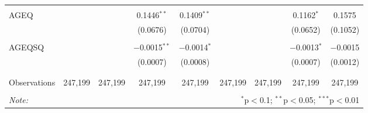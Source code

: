 \documentclass{article}
\begin{document}
\begin{sidewaystable}[!htbp]
\begin{tabular}{@{\extracolsep{5pt}}lcccccccc}
  & & & & & & & & \\ 
 AGEQ &  &  & 0.1446$^{**}$ & 0.1409$^{**}$ &  &  & 0.1162$^{*}$ & 0.1575 \\ 
  &  &  & (0.0676) & (0.0704) &  &  & (0.0652) & (0.1052) \\ 
  & & & & & & & & \\ 
 AGEQSQ &  &  & $-$0.0015$^{**}$ & $-$0.0014$^{*}$ &  &  & $-$0.0013$^{*}$ & $-$0.0015 \\ 
  &  &  & (0.0007) & (0.0008) &  &  & (0.0007) & (0.0012) \\ 
  & & & & & & & & \\ 
\hline \\[-1.8ex] 
Observations & 247,199 & 247,199 & 247,199 & 247,199 & 247,199 & 247,199 & 247,199 & 247,199 \\ 
\hline 
\hline \\[-1.8ex] 
\textit{Note:}  & \multicolumn{8}{r}{$^{*}$p$<$0.1; $^{**}$p$<$0.05; $^{***}$p$<$0.01} \\ 
\end{tabular} 
\end{sidewaystable} 
\end{document}
